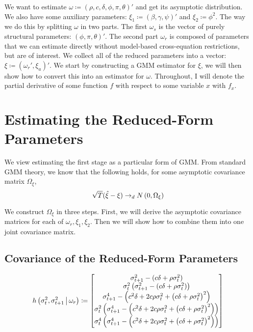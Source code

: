 \documentclass[11pt, letterpaper, twoside]{article}
\begin{document}
We want to estimate $\omega \coloneqq (\rho, c, \delta, \phi, \pi, \theta)'$ and get its asymptotic distribution.
We also have some auxiliary parameters: $\xi_1 \coloneqq (\beta, \gamma, \psi)'$ and $\xi_2 \coloneqq \phi^2$.
The way we do this by splitting $\omega$ in two parts.
The first $\omega_s$ is the vector of purely structural parameters: $(\phi, \pi, \theta)'$.
The second part $\omega_r$ is composed of parameters that we can estimate directly without model-based
cross-equation restrictions, but are of interest.
We collect all of the reduced parameters into a vector: $\xi \coloneqq (\omega_r', \xi_a)'$.
We start by constructing a GMM estimator for $\xi$, we will then show how to convert this into an estimator for
$\omega$.
Throughout, I will denote the partial derivative of some function $f$ with respect to some variable $x$ with
$f_x$.

\section{Estimating the Reduced-Form Parameters}\label{sec:EstimatingReducedForm}

We view estimating the first stage as a particular form of GMM.
From standard GMM theory, we know that the following holds, for some asymptotic covariance matrix $\Omega_{\xi}$,
%
\begin{equation}
  \sqrt{T} (\hat{\xi} - \xi) \to_d N\left(0, \Omega_{\xi}\right)
\end{equation}

We construct $\Omega_{\xi}$ in three steps.
First, we will derive the asymptotic covariance matrices for each of $\omega_r, \xi_1, \xi_2$.
Then we will show how to combine them into one joint covariance matrix.

\subsection{Covariance of the Reduced-Form Parameters}\label{sec:omega_r}

\begin{equation}
  h\left(\sigma^2_{t},\sigma^2_{t+1} \mvert \omega_r\right) \coloneqq 
\begin{bmatrix}
  \sigma^2_{t+1} - (c \delta + \rho \sigma^2_{t}) \\
%
  \sigma^2_{t} \left(\sigma^2_{t+1} - (c \delta + \rho \sigma^2_{t})\right)\\
%
  \sigma^4_{t+1} - \left(c^{2} \delta + 2 c \rho \sigma^2_{t} + \left(c \delta + \rho
  \sigma^2_{t}\right)^{2}\right)\\
%
  \sigma^2_{t} \left(\sigma^4_{t+1} - \left(c^{2} \delta + 2 c \rho \sigma^2_{t} + \left(c \delta + \rho
  \sigma^2_{t}\right)^{2}\right)\right)\\

  \sigma^4_{t} \left(\sigma^4_{t+1} - \left(c^{2} \delta + 2 c \rho \sigma^2_{t} + \left(c \delta + \rho
  \sigma^2_{t}\right)^{2}\right)\right)\\
\end{bmatrix}
\end{equation}
\end{document}
